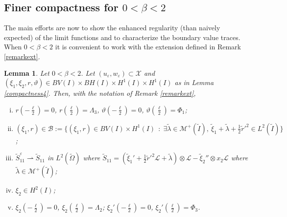 \documentclass[a4, 11pt, reqno, final]{amsart}
\newcommand{\calB}{\mathcal{B}}
\newcommand{\calL}{\mathcal{L}}
\newcommand{\calM}{\mathcal{M}}
\newcommand{\calX}{\mathcal{X}}
\newcommand\e{\varepsilon}
\newcommand\weak{\rightharpoonup} %
\theoremstyle{plain}%
\newtheorem{lemma}[theorem]{Lemma}
\DeclareMathOperator{\st}{\,:\,}
\begin{document}
	\subsection{Finer compactness for $0<\beta < 2$}
	The main efforts are now to show the enhanced regularity (than naively expected) of the limit functions and to characterize the boundary value traces.
	When $0<\beta<2$ it is convenient to work with the extension defined in Remark \ref{remarkext}.



	\begin{lemma}\label{mulambda}
		Let $0<\beta <2$. 		Let $(u_\e, w_{\e})\subset \calX$ and  $(\xi_1, \xi_2, r, \vartheta) \in BV(I)\times BH(I)\times H^1(I) \times H^1(I)$ as in Lemma \ref{compactness4}.
		Then, with the notation of Remark \ref{remarkext},
		\begin{enumerate}[(i)]
			\item $r(-\frac{\ell}{2}) = 0$, $r(\frac{\ell}{2}) = \Lambda_3$, $\vartheta(-\frac{\ell}{2}) = 0$, $\vartheta(\frac{\ell}{2}) = \Phi_1$;
			\item $(\xi_1,r) \in \calB := \{(\xi_1,r) \in BV(I)\times H^1(I) \st \exists \widetilde{\lambda} \in \calM^+(\widetilde{I}), \ \widetilde{\xi}_1 + \widetilde{\lambda} +\frac12 \widetilde{r}'^2\in L^2(\widetilde{I})\}$;
			\item $\widetilde{S}^\e_{11} \weak \widetilde{S}_{11}$ in $L^2(\widetilde{\Omega})$ where 		$
			\widetilde{S}_{11}=(\widetilde{\xi}_1'+ \frac12 \widetilde{r}'^2\calL+\widetilde{\lambda})\otimes \calL  - \widetilde{\xi}_2''\otimes x_2 \calL$
			where $\widetilde{\lambda} \in \calM^+(\widetilde{I})$;
			\item $\xi_2 \in H^2(I)$;
			\item $\xi_2(-\frac{\ell}{2})=0$, $\xi_2(\frac{\ell}{2})=\Lambda_2$; $\xi_2'(-\frac{\ell}{2})=0$, $\xi_2'(\frac{\ell}{2})=\Phi_3$.
		\end{enumerate}
	\end{lemma}
\end{document}
